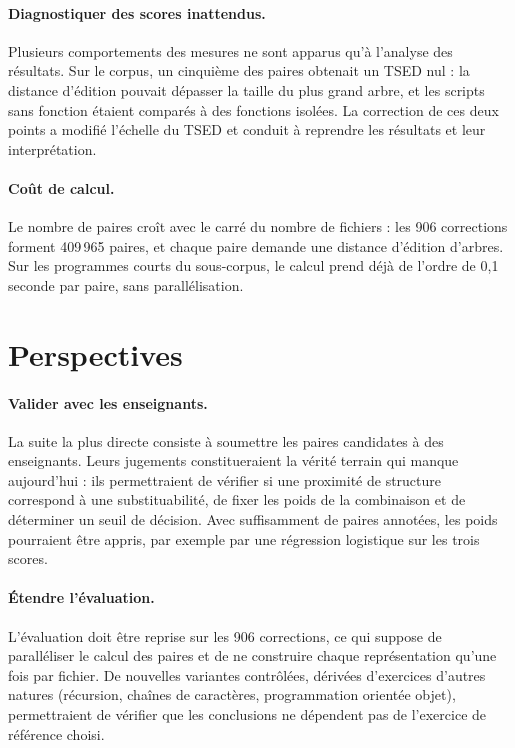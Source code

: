 \documentclass[12pt,a4paper,oneside]{report}
\begin{document}
\paragraph{Diagnostiquer des scores inattendus.}
Plusieurs comportements des mesures ne sont apparus qu'à l'analyse des
résultats. Sur le corpus, un cinquième des paires obtenait un TSED nul : la
distance d'édition pouvait dépasser la taille du plus grand arbre, et les
scripts sans fonction étaient comparés à des fonctions isolées. La
correction de ces deux points a modifié l'échelle du TSED et conduit à
reprendre les résultats et leur interprétation.

\paragraph{Coût de calcul.}
Le nombre de paires croît avec le carré du nombre de fichiers : les 906
corrections forment 409\,965 paires, et chaque paire demande une distance
d'édition d'arbres. Sur les programmes courts du sous-corpus, le calcul
prend déjà de l'ordre de 0,1 seconde par paire, sans parallélisation.

\section{Perspectives}

\paragraph{Valider avec les enseignants.}
La suite la plus directe consiste à soumettre les paires candidates à des
enseignants. Leurs jugements constitueraient la vérité terrain qui manque
aujourd'hui : ils permettraient de vérifier si une proximité de structure
correspond à une substituabilité, de fixer les poids de la combinaison et
de déterminer un seuil de décision. Avec suffisamment de paires annotées,
les poids pourraient être appris, par exemple par une régression
logistique sur les trois scores.

\paragraph{Étendre l'évaluation.}
L'évaluation doit être reprise sur les 906 corrections, ce qui suppose de
paralléliser le calcul des paires et de ne construire chaque représentation
qu'une fois par fichier. De nouvelles variantes contrôlées, dérivées
d'exercices d'autres natures (récursion, chaînes de caractères,
programmation orientée objet), permettraient de vérifier que les
conclusions ne dépendent pas de l'exercice de référence choisi.
\end{document}
